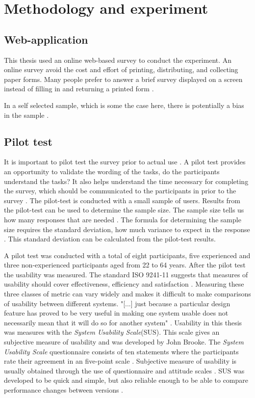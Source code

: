 \chapter{Methodology and experiment}

\section{Web-application}
This thesis used an online web-based survey to conduct the experiment. An online survey avoid the cost and effort of printing, distributing, and collecting paper forms. Many people prefer to answer a brief survey displayed on a screen instead of filling in and returning a printed form \citep{Ben2009}.   

In a self selected sample, which is some the case here, there is potentially a bias in the sample \citep{Ben2009}. %

\section{Pilot test}
It is important to pilot test the survey prior to actual use \citep{Ben2009}. A pilot test provides an opportunity to validate the wording of the tasks, do the participants understand the tasks? It also helps understand the time necessary for completing the survey, which should be communicated to the participants in prior to the survey \citep{Schade2015}. The pilot-test is conducted with a small sample of users. Results from the pilot-test can be used to determine the sample size. The sample size tells us how many responses that are needed \citep{Smith2013}. The formula for determining the sample size requires the standard deviation, how much variance to expect in the response \citep{Smith2013}. This standard deviation can be calculated from the pilot-test results.

A pilot test was conducted with a total of eight participants, five experienced and three non-experienced participants aged from 22 to 64 years. After the pilot test the usability was measured. The standard ISO 9241-11 suggests that measures of usability should cover effectiveness, efficiency and satisfaction \citep{ISO1998}. Measuring these three classes of metric can vary widely and makes it difficult to make comparisons of usability between different systems. "[...] just because a particular design feature has proved to be very useful in making one system usable does not necessarily mean that it will do so for another system" \citep{Brooke1996}. Usability in this thesis was measures with the \textit{System Usability Scale}(SUS). This scale gives an subjective measure of usability and was developed by John Brooke. The \textit{System Usability Scale} questionnaire consists of ten statements where the participants rate their agreement in an five-point scale \citep{Ben2009}. Subjective measure of usability is usually obtained through the use of questionnaire and attitude scales \citep{Brooke1996}. SUS was developed to be quick and simple, but also reliable enough to be able to compare performance changes between versions \citep{Brooke1996}.  


